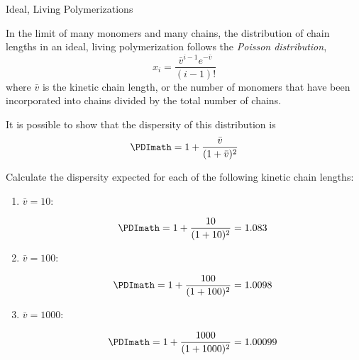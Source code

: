 \begin{activity}{Ideal, Living Polymerizations}
\begin{ctqs}
\end{ctqs}

\begin{infobox}

	In the limit of many monomers and many chains, the distribution of chain lengths in an ideal, living polymerization follows the \emph{Poisson distribution},
	\begin{equation*}
		x_i = \frac{\bar v^{i-1}e^{-\bar v}}{(i-1)!}
	\end{equation*}
	where $\bar v$ is the kinetic chain length, or the number of monomers that have been incorporated into chains divided by the total number of chains.
	
	It is possible to show that the dispersity of this distribution is
	\begin{equation*}
		\PDImath = 1+\frac{\bar v}{(1+\bar v)^2}
	\end{equation*}

	\label{\labelbase:infobox:poisson}

\end{infobox}

\begin{ctqs}

	\question Calculate the dispersity expected for each of the following kinetic chain lengths: \label{\labelbase:ctq:poissondispersities}
	
		\begin{enumerate}
		
			\item $\bar v = 10$:
			
				\begin{solution}[0.25in]
					\begin{equation*}
						\PDImath = 1+\frac{10}{(1+10)^2} = 1.083
					\end{equation*}
				\end{solution}
			
			\item $\bar v = 100$:
			
				\begin{solution}[0.25in]
					\begin{equation*}
						\PDImath = 1+\frac{100}{(1+100)^2} = 1.0098
					\end{equation*}
				\end{solution}
			
			\item $\bar v = 1000$:
			
				\begin{solution}[0.25in]
					\begin{equation*}
						\PDImath = 1+\frac{1000}{(1+1000)^2} = 1.00099
					\end{equation*}
				\end{solution}
			

\end{enumerate}
\end{ctqs}
\end{activity}
